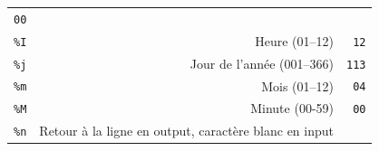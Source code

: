 \documentclass[12pt,]{book}
\numberwithin{equation}{section}
\numberwithin{countremarque}{section}
\begin{document}
\begin{longtable}[]{@{}rrr@{}}
\begin{minipage}[t]{0.22\columnwidth}
\texttt{00}\strut
\end{minipage}\tabularnewline
\begin{minipage}[t]{0.10\columnwidth}\raggedleft\strut
\texttt{\%I}\strut
\end{minipage} & \begin{minipage}[t]{0.60\columnwidth}\raggedleft\strut
Heure (01--12)\strut
\end{minipage} & \begin{minipage}[t]{0.22\columnwidth}\raggedleft\strut
\texttt{12}\strut
\end{minipage}\tabularnewline
\begin{minipage}[t]{0.10\columnwidth}\raggedleft\strut
\texttt{\%j}\strut
\end{minipage} & \begin{minipage}[t]{0.60\columnwidth}\raggedleft\strut
Jour de l'année (001--366)\strut
\end{minipage} & \begin{minipage}[t]{0.22\columnwidth}\raggedleft\strut
\texttt{113}\strut
\end{minipage}\tabularnewline
\begin{minipage}[t]{0.10\columnwidth}\raggedleft\strut
\texttt{\%m}\strut
\end{minipage} & \begin{minipage}[t]{0.60\columnwidth}\raggedleft\strut
Mois (01--12)\strut
\end{minipage} & \begin{minipage}[t]{0.22\columnwidth}\raggedleft\strut
\texttt{04}\strut
\end{minipage}\tabularnewline
\begin{minipage}[t]{0.10\columnwidth}\raggedleft\strut
\texttt{\%M}\strut
\end{minipage} & \begin{minipage}[t]{0.60\columnwidth}\raggedleft\strut
Minute (00-59)\strut
\end{minipage} & \begin{minipage}[t]{0.22\columnwidth}\raggedleft\strut
\texttt{00}\strut
\end{minipage}\tabularnewline
\begin{minipage}[t]{0.10\columnwidth}\raggedleft\strut
\texttt{\%n}\strut
\end{minipage} & \begin{minipage}[t]{0.60\columnwidth}\raggedleft\strut
Retour à la ligne en output, caractère blanc en input\strut
\end{minipage} & \begin{minipage}[t]{0.22\columnwidth}\raggedleft\strut

\end{minipage}
\end{longtable}
\end{document}
